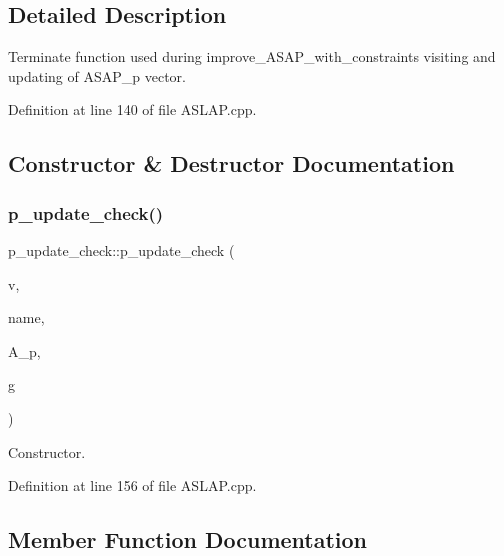 \subsection{Detailed Description}
Terminate function used during improve\+\_\+\+A\+S\+A\+P\+\_\+with\+\_\+constraints visiting and updating of A\+S\+A\+P\+\_\+p vector. 

Definition at line 140 of file A\+S\+L\+A\+P.\+cpp.



\subsection{Constructor \& Destructor Documentation}
\mbox{\label{structp__update__check_ad7bc7e03d9cf28176dd84cfe0280eddf}} 
\subsubsection{\texorpdfstring{p\+\_\+update\+\_\+check()}{p\_update\_check()}}
{\footnotesize\ttfamily p\+\_\+update\+\_\+check\+::p\+\_\+update\+\_\+check (\begin{DoxyParamCaption}\item[{\hyperlink{graph_8hpp_abefdcf0544e601805af44eca032cca14}{vertex}}]{v,  }\item[{const std\+::string \&}]{name,  }\item[{\hyperlink{structvertex2int}{vertex2int} \&}]{A\+\_\+p,  }\item[{const \hyperlink{op__graph_8hpp_a9a0b240622c47584bee6951a6f5de746}{Op\+Graph\+Const\+Ref}}]{g }\end{DoxyParamCaption})\hspace{0.3cm}{\ttfamily [inline]}}



Constructor. 



Definition at line 156 of file A\+S\+L\+A\+P.\+cpp.



\subsection{Member Function Documentation}
\mbox{\label{structp__update__check_af49822a0e6841ca43018a41786178b4f}} 
